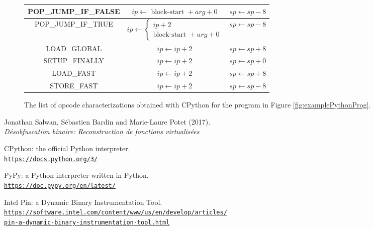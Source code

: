 \documentclass[english]{article}
\begin{document}
\begin{figure}[htp]
\begin{tabular}{|c|c|c|}
		\hline
		POP\_JUMP\_IF\_FALSE & $ip \leftarrow \textrm{ block-start } + arg + 0$ & $sp \leftarrow sp - 8$\\
		\hline
		POP\_JUMP\_IF\_TRUE & 
		$ip \leftarrow 
		\left\{ 
		\begin{array}{ll}
		ip + 2 \\ 
		\textrm{block-start } + arg + 0
		\end{array}
		\right.$ & $sp \leftarrow sp - 8$\\
		\hline
		LOAD\_GLOBAL & $ip \leftarrow ip + 2$ & $sp \leftarrow sp + 8$\\
		\hline
		SETUP\_FINALLY & $ip \leftarrow ip + 2$ & $sp \leftarrow sp + 0$\\
		\hline
		LOAD\_FAST & $ip \leftarrow ip + 2$ & $sp \leftarrow sp + 8$\\
		\hline
		STORE\_FAST & $ip \leftarrow ip + 2$ & $sp \leftarrow sp - 8$\\
		\hline
	\end{tabular}
	\caption{The list of opcode characterizations obtained with CPython for the program in Figure \ref{fig:examplePythonProg}.}
	\label{fig:semanticsTable}
\end{figure}



\begin{thebibliography}{9}
	Jonathan Salwan, Sébastien Bardin and Marie-Laure Potet (2017).
	\\\textit{Désobfuscation binaire: Reconstruction de fonctions virtualisées}
	
	CPython: the official Python interpreter.
	\href{https://docs.python.org/3/}{\\\texttt{https://docs.python.org/3/}}
	
	PyPy: a Python interpreter written in Python.
	\href{https://doc.pypy.org/en/latest/}{\\\texttt{https://doc.pypy.org/en/latest/}}
	
	Intel Pin: a Dynamic Binary Instrumentation Tool.
	\href{https://software.intel.com/content/www/us/en/develop/articles/pin-a-dynamic-binary-instrumentation-tool.html}{\\\texttt{https://software.intel.com/content/www/us/en/develop/articles/\\pin-a-dynamic-binary-instrumentation-tool.html}}
\end{thebibliography}
\end{document}
